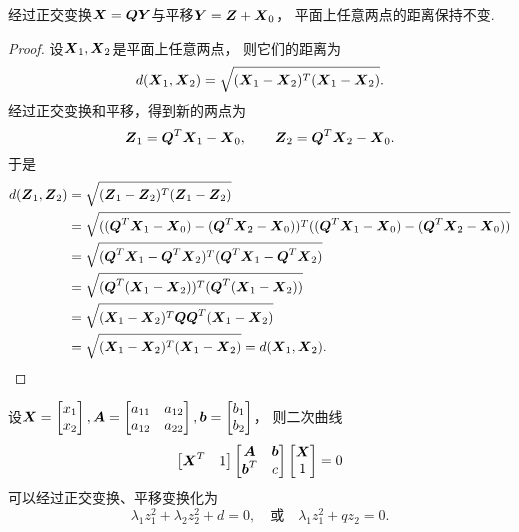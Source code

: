 \begin{lemma}
经过正交变换\(\boldsymbol{X} = \boldsymbol{Q} \boldsymbol{Y}\)与平移\(\boldsymbol{Y} = \boldsymbol{Z} + \boldsymbol{X}_0\)，
平面上任意两点的距离保持不变.
\begin{proof}
设\(\boldsymbol{X}_1,\boldsymbol{X}_2\)是平面上任意两点，
则它们的距离为\[
	d(\boldsymbol{X}_1,\boldsymbol{X}_2)
	= \sqrt{(\boldsymbol{X}_1-\boldsymbol{X}_2)^T(\boldsymbol{X}_1-\boldsymbol{X}_2)}.
\]
经过正交变换和平移，得到新的两点为\[
	\boldsymbol{Z}_1 = \boldsymbol{Q}^T \boldsymbol{X}_1 - \boldsymbol{X}_0,
	\qquad
	\boldsymbol{Z}_2 = \boldsymbol{Q}^T \boldsymbol{X}_2 - \boldsymbol{X}_0.
\]
于是\begin{align*}
	d(\boldsymbol{Z}_1,\boldsymbol{Z}_2)
	&= \sqrt{(\boldsymbol{Z}_1-\boldsymbol{Z}_2)^T(\boldsymbol{Z}_1-\boldsymbol{Z}_2)} \\
	&= \sqrt{
		((\boldsymbol{Q}^T \boldsymbol{X}_1 - \boldsymbol{X}_0) - (\boldsymbol{Q}^T \boldsymbol{X}_2 - \boldsymbol{X}_0))^T
		((\boldsymbol{Q}^T \boldsymbol{X}_1 - \boldsymbol{X}_0) - (\boldsymbol{Q}^T \boldsymbol{X}_2 - \boldsymbol{X}_0))
	} \\
	&= \sqrt{
		(\boldsymbol{Q}^T \boldsymbol{X}_1 - \boldsymbol{Q}^T \boldsymbol{X}_2)^T
		(\boldsymbol{Q}^T \boldsymbol{X}_1 - \boldsymbol{Q}^T \boldsymbol{X}_2)
	} \\
	&= \sqrt{
		(\boldsymbol{Q}^T (\boldsymbol{X}_1 - \boldsymbol{X}_2))^T
		(\boldsymbol{Q}^T (\boldsymbol{X}_1 - \boldsymbol{X}_2))
	} \\
	&= \sqrt{
		(\boldsymbol{X}_1 - \boldsymbol{X}_2)^T
		\boldsymbol{Q} \boldsymbol{Q}^T
		(\boldsymbol{X}_1 - \boldsymbol{X}_2)
	} \\
	&= \sqrt{
		(\boldsymbol{X}_1 - \boldsymbol{X}_2)^T
		(\boldsymbol{X}_1 - \boldsymbol{X}_2)
	}
	= d(\boldsymbol{X}_1,\boldsymbol{X}_2).
	\qedhere
\end{align*}
\end{proof}
\end{lemma}

\begin{theorem}[平面二次曲线的分类定理]
设\(\boldsymbol{X} = \begin{bmatrix}
	x_1 \\ x_2
\end{bmatrix},
\boldsymbol{A} = \begin{bmatrix}
	a_{11} & a_{12} \\
	a_{12} & a_{22}
\end{bmatrix},
\boldsymbol{b} = \begin{bmatrix}
	b_1 \\ b_2
\end{bmatrix}\)，
则二次曲线\[
	\begin{bmatrix}
		\boldsymbol{X}^T & 1
	\end{bmatrix}
	\begin{bmatrix}
		\boldsymbol{A} & \boldsymbol{b} \\
		\boldsymbol{b}^T & c
	\end{bmatrix}
	\begin{bmatrix}
		\boldsymbol{X} \\ 1
	\end{bmatrix}
	= 0
\]可以经过正交变换、平移变换化为\[
	\lambda_1 z_1^2 + \lambda_2 z_2^2 + d = 0,
	\quad\text{或}\quad
	\lambda_1 z_1^2 + q z_2 = 0.
\]
\end{theorem}

